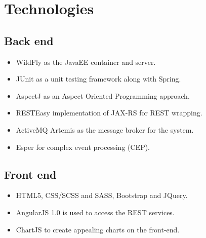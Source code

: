 \documentclass[11pt,a4paper]{article}
\begin{document}
%
	
\section{Technologies}
\subsection{Back end}
\begin{itemize}
	\item WildFly as the JavaEE container and server.
	\item JUnit as a unit testing framework along with Spring.
	\item AspectJ as an Aspect Oriented Programming approach.
	\item RESTEasy implementation of JAX-RS for REST wrapping.
	\item ActiveMQ Artemis as the message broker for the system.
	\item Esper for complex event processing (CEP).
\end{itemize}
\subsection{Front end}
\begin{itemize}
	\item HTML5, CSS/SCSS and SASS, Bootstrap and JQuery.
	\item AngularJS 1.0 is used to access the REST services.
	\item ChartJS to create appealing charts on the front-end.
\end{itemize}
\end{document}

